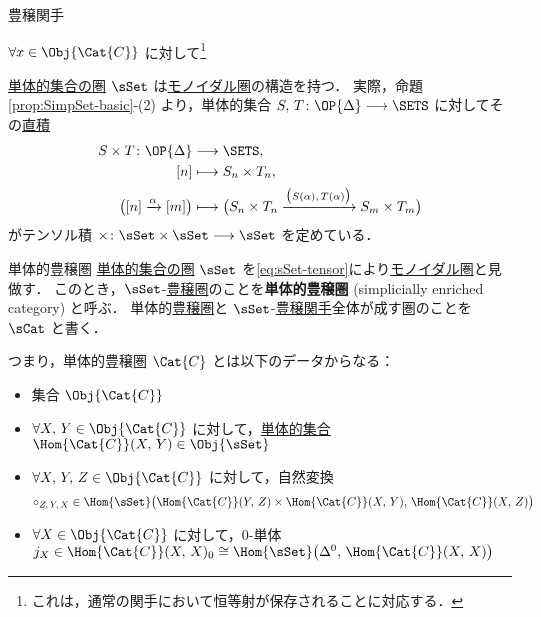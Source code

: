 \documentclass[TQFT_main]{subfiles}
\begin{document}
\begin{mydef}[label=def:enriched-functor,breakable]{豊穣関手}
\begin{description}
        $\forall x \in \Obj{\Cat{C}}$ に対して\footnote{これは，通常の関手において恒等射が保存されることに対応する．}
        \begin{center}
        \end{center}
    \end{description}
\end{mydef}

\hyperref[def:SimpSet]{単体的集合の圏} $\sSet$ は\hyperref[def:monoidal-category]{モノイダル圏}の構造を持つ．
実際，命題\ref{prop:SimpSet-basic}-(2) より，単体的集合 $S,\, T \colon \OP{\Delta} \lto \SETS$ に対してその\hyperref[def:product-coproduct]{直積}
\begin{align}
    \label{eq:sSet-tensor}
    S \times T \colon \OP{\Delta} &\lto \SETS,\\ 
    [n] &\lmto S_n \times T_n, \\
    \bigl( [n] \xrightarrow{\alpha} [m] \bigr) &\lmto \bigl( S_n \times T_n \xrightarrow{\bigl(S(\alpha),\, T(\alpha)\bigr)} S_{m} \times T_{m} \bigr) 
\end{align}
がテンソル積 $\times \colon \sSet \times \sSet \lto \sSet$ を定めている．

\begin{mydef}[label=def:SimpCat]{単体的豊穣圏}
    \hyperref[def:SimpSet]{単体的集合の圏} $\sSet$ を\eqref{eq:sSet-tensor}により\hyperref[redef:monoidal-category]{モノイダル圏}と見做す．
    このとき，$\sSet$-\hyperref[def:enriched]{豊穣圏}のことを\textbf{単体的豊穣圏} (simplicially enriched category) と呼ぶ．
    \tcblower
    単体的\hyperref[def:enriched]{豊穣圏}と $\sSet$-\hyperref[def:enriched-functor]{豊穣関手}全体が成す圏のことを $\sCat$ と書く．
\end{mydef}

つまり，単体的豊穣圏 $\Cat{C}$ とは以下のデータからなる：
\begin{itemize}
    \item 集合 $\Obj{\Cat{C}}$
    \item $\forall X,\, Y \in \Obj{\Cat{C}}$ に対して，\hyperref[def:SimpSet]{単体的集合} $\Hom{\Cat{C}}(X,\, Y) \in \Obj{\sSet}$
    \item $\forall X,\, Y,\, Z \in \Obj{\Cat{C}}$ に対して，自然変換
    \begin{align}
        \circ_{Z,\, Y,\, X} \in \Hom{\sSet} \bigl( \Hom{\Cat{C}}(Y,\, Z) \times \Hom{\Cat{C}}(X,\, Y),\, \Hom{\Cat{C}}(X,\, Z) \bigr) 
    \end{align}
    \item $\forall X \in \Obj{\Cat{C}}$ に対して，$0$-単体 $j_X \in \Hom{\Cat{C}}(X,\, X)_0 \cong \Hom{\sSet} \bigl( \Delta^0,\, \Hom{\Cat{C}}(X,\, X) \bigr)$
\end{itemize}
\end{document}
